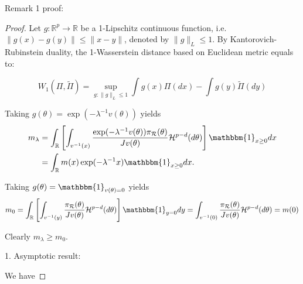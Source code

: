 \documentclass[10pt]{article}
\newcommand{\mc}[1]{\mathcal{#1}}
\DeclareMathOperator{\1}{\mathbbm{1}}
\begin{document}
Remark 1 proof:
\begin{proof}[Proof]
Let $g:\mathbb{R}^p\rightarrow \mathbb{R}$ be a 1-Lipschitz continuous function, i.e. $\|g(x)-g(y)\|\le \|x-y\|$, denoted by $\|g\|_L\le 1$. 
By Kantorovich-Rubinstein duality, the 1-Wasserstein distance based on Euclidean metric equals to: 

\begin{equation}
W_1(\Pi,\tilde\Pi)=\underset{g:\|g\|_L\le 1}\sup \int g(x) \Pi(dx) -  \int g(y) \tilde\Pi(dy) 
\end{equation}

Taking $g(\theta)=\exp(-\lambda^{-1}v(\theta))$ yields
	\begin{equation}
	\begin{aligned}
	m_\lambda
	& = \int_\mathbb{R}  \left[ \int_{v^{-1}(x)} \frac{ \exp(- \lambda^{-1} v(\theta) ) \pi_{\mc R}(\theta)}{ J v(\theta) } \mathcal{H}^{p-d}(d \theta) \right] \mathbbm{1}_{x \ge 0}  d x \\
	& = \int_\mathbb{R}  m(x)\exp(- \lambda^{-1} x ) \mathbbm{1}_{x \ge 0}  d x .
		\end{aligned}
	\end{equation}
	
Taking $g(\theta)={\mathbbm{1}_{v(\theta)=0}}$ yields 
	\begin{equation}
	m_0
	= \int_\mathbb{R} \left[ \int_{v^{-1}(y)} \frac{ \pi_{\mc R}(\theta) }{ J v(\theta) } \mathcal{H}^{p-d}(d \theta) \right]\mathbbm{1}_{y=0} dy   =  \int_{v^{-1}(0)} \frac{ \pi_{\mc R}(\theta) }{ J v(\theta) } \mathcal{H}^{p-d}(d \theta) =m(0)
	\end{equation}
	
	Clearly $m_\lambda \ge m_0$.
	
1. Asymptotic result:
	
We have
	

\end{proof}
\end{document}

